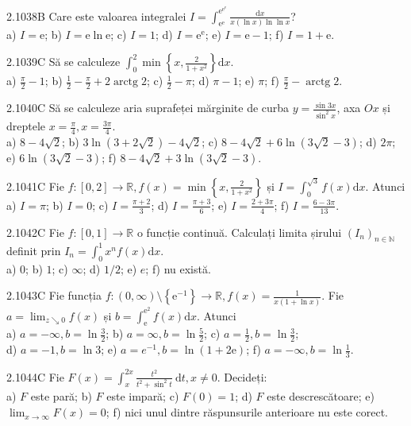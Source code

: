\documentclass[11pt]{article}
\begin{document}
2.1038B Care este valoarea integralei $I=\int_{\mathrm{e}^{\mathrm{e}}}^{\mathrm{e}^{\mathrm{e}^{\mathrm{e}}}} \frac{\mathrm{d} x}{x(\ln x) \ln \ln x}$?\\ a) $I=\mathrm{e}$; b) $I=\mathrm{e} \ln \mathrm{e}$; c) $I=1$; d) $I=\mathrm{e}^{\mathrm{e}}$; e) $I=\mathrm{e}-1$; f) $I=1+\mathrm{e}$.

2.1039C Să se calculeze $\int_{0}^{2} \min \left\{x, \frac{2}{1+x^{2}}\right\} \mathrm{d} x$.\\ a) $\frac{\pi}{2}-1$; b) $\frac{1}{2}-\frac{\pi}{2}+2 \operatorname{arctg} 2$; c) $\frac{1}{2}-\pi$; d) $\pi-1$; e) $\pi$; f) $\frac{\pi}{2}-\operatorname{arctg} 2$.

2.1040C Să se calculeze aria suprafeței mărginite de curba $y=\frac{\sin 3 x}{\sin ^{2} x}$, axa $O x$ și dreptele $x=\frac{\pi}{4}, x=\frac{3 \pi}{4}$.\\ a) $8-4 \sqrt{2}$; b) $3 \ln (3+2 \sqrt{2})-4 \sqrt{2}$; c) $8-4 \sqrt{2}+6 \ln (3 \sqrt{2}-3)$; d) $2 \pi$;\\ e) $6 \ln (3 \sqrt{2}-3)$; f) $8-4 \sqrt{2}+3 \ln (3 \sqrt{2}-3)$.

2.1041C Fie $f:[0,2] \rightarrow \mathbb{R}, f(x)=\min \left\{x, \frac{2}{1+x^{2}}\right\}$ și $I=\int_{0}^{\sqrt{3}} f(x) \mathrm{d} x$. Atunci\\ a) $I=\pi$; b) $I=0$; c) $I=\frac{\pi+2}{3}$; d) $I=\frac{\pi+3}{6}$; e) $I=\frac{2+3 \pi}{4}$; f) $I=\frac{6-3 \pi}{13}$.

2.1042C Fie $f:[0,1] \rightarrow \mathbb{R}$ o funcție continuă. Calculați limita șirului $\left(I_{n}\right)_{n \in \mathbb{N}}$ definit prin $I_{n}=\int_{0}^{1} x^{n} f(x) \mathrm{d} x$.\\ a) $0$; b) $1$; c) $\infty$; d) $1 / 2$; e) $e$; f) nu există.

2.1043C Fie funcția $f:(0, \infty) \setminus\left\{\mathrm{e}^{-1}\right\} \rightarrow \mathbb{R}, f(x)=\frac{1}{x(1+\ln x)}$. Fie $a=\lim _{z \searrow 0} f(x)$ și $b=\int_{\mathrm{e}}^{\mathrm{e}^{2}} f(x) \mathrm{d} x$. Atunci\\ a) $a=-\infty, b=\ln \frac{3}{2}$; b) $a=\infty, b=\ln \frac{5}{2}$; c) $a=\frac{1}{2}, b=\ln \frac{3}{2}$;\\ d) $a=-1, b=\ln 3$; e) $a=e^{-1}, b=\ln (1+2 \mathrm{e})$; f) $a=-\infty, b=\ln \frac{1}{3}$.

2.1044C Fie $F(x)=\int_{x}^{2 x} \frac{t^{2}}{t^{2}+\sin ^{2} t} \mathrm{~d} t, x \neq 0$. Decideți:\\ a) $F$ este pară; b) $F$ este impară; c) $F(0)=1$; d) $F$ este descrescătoare; e) $\lim _{x \rightarrow \infty} F(x)=0$; f) nici unul dintre răspunsurile anterioare nu este corect.
\end{document}
